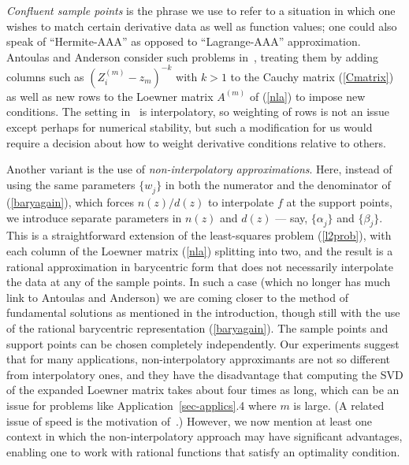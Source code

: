 \documentclass[final]{siamltex}
\def\Am{A^{(m)}}
\begin{document}
{\em Confluent sample points} is the phrase we use to refer to a
situation in which one wishes to match certain derivative data as
well as function values; one could also speak of ``Hermite-AAA''
as opposed to ``Lagrange-AAA'' approximation.  Antoulas and
Anderson consider such problems in~\cite{aa}, treating them
by adding columns such as $(Z_i^{(m)}-z_m^{})^{-k}$ with $k>1$
to the Cauchy matrix (\ref{Cmatrix}) as well as new rows to the
Loewner matrix $\Am$ of (\ref{nla}) to impose new conditions.
The setting in~\cite{aa} is interpolatory, so weighting of rows
is not an issue except perhaps for numerical stability, but such
a modification for us would require a decision about how to weight
derivative conditions relative to others.

Another variant is the use of {\em non-interpolatory
approximations}.  Here, instead of using the same parameters
$\{w_j^{}\}$ in both the numerator and the denominator of (\ref{baryagain}),
which forces $n(z)/d(z)$ to interpolate $f$ at the support points,
we introduce separate parameters in $n(z)$ and $d(z)$ --- say,
$\{\alpha_j^{}\}$ and $\{\beta_j^{}\}$.  This is a straightforward
extension of the least-squares problem (\ref{l2prob}), with each
column of the Loewner matrix (\ref{nla}) splitting into two,
and the result is a rational approximation in barycentric form
that does not necessarily interpolate the data at any of the
sample points.  In such a case (which no longer has much link
to Antoulas and Anderson) we are coming closer to the method of
fundamental solutions as mentioned in the introduction, though
still with the use of the rational barycentric representation
(\ref{baryagain}).  The sample points and support points can be
chosen completely independently.  Our experiments suggest that
for many applications, non-interpolatory approximants are not so
different from interpolatory ones, and they have the disadvantage
that computing the SVD of the expanded Loewner matrix takes
about four times as long, which can be an issue for problems like
Application~\ref{sec-applics}.4 where $m$ is large.  (A related
issue of speed is the motivation of~\cite{berrut00}.)  However,
we now mention at least one context in which the non-interpolatory
approach may have significant advantages, enabling one to 
work with rational functions that satisfy an optimality
condition.
\end{document}
